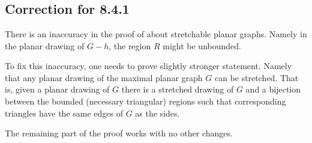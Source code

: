 \appendix
\chapter{}
\section*{Correction for 8.4.1}

There is an inaccuracy in the proof of \cite[Theorem 8.4.1]{pearls} about stretchable planar graphs.
Namely in the planar drawing of $G-h$, the region $R$ might be unbounded.

To fix this inaccuracy, one needs to prove slightly stronger statement.
Namely that any planar drawing of the maximal planar graph $G$ can be stretched.
That is, given a planar drawing of $G$ there is a stretched drawing of $G$ 
and a bijection between the bounded (necessary triangular) regions such that corresponding triangles have the same edges of $G$ as the sides.

The remaining part of the proof works with no other changes.
